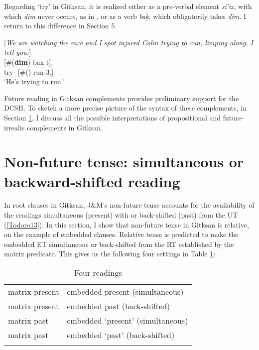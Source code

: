 \documentclass[output=paper]{langscibook}
\begin{document}
	Regarding ‘try’ in Gitksan, it is realized either as a pre-verbal element \emph{si’ix}, with which \emph{dim} never occurs, as in , or as a verb \emph{bak̲}, which obligatorily takes \emph{dim}. I return to this difference in Section 5. 
	
\begin{exe}
\ex \label{Todoro22} [\emph{We are watching the race and I spot injured Colin trying to run,
         limping along. I tell you:}] \\
	[\#(\textbf{{dim}}) 	{bax̱-t}].  \\
    {try}- [\#() run-3.{\seriesII}]\\
\glt `He's trying to run.'
\end{exe}

Future reading in Gitksan complements provides preliminary support for the DCSH. To sketch a more precise picture of the syntax of these complements, in Section \ref{Todoro:sect4}, I discuss all the possible interpretations of propositional and future-irrealis complements in Gitksan. 

\section{Non-future tense: simultaneous or backward-shifted reading}\label{Todoro:sect4}

In root clauses in Gitksan, J\&M’s non-future tense accounts for the availability of the readings simultaneous (present) with or back-shifted (past) from the UT (\ref{Todoro13}). In this section, I show that non-future tense in Gitksan is relative, on the example of embedded clauses. Relative tense is predicted to make the embedded ET simultaneous or back-shifted from the RT established by the matrix predicate. This gives us the following four settings in Table \ref{Todorotab1}: 

\begin{table}
\caption{Four readings}
\label{Todorotab1}
 \begin{tabular}{l  l  }
  \lsptoprule
 matrix present &	embedded present (simultaneous) \\
matrix present &	embedded past (back-shifted) \\
matrix past	& embedded ‘present’ (simultaneous)\\
matrix past	& embedded ‘past’ (back-shifted)\\
  \lspbottomrule
 \end{tabular}
 \end{table}
 
\end{document}

